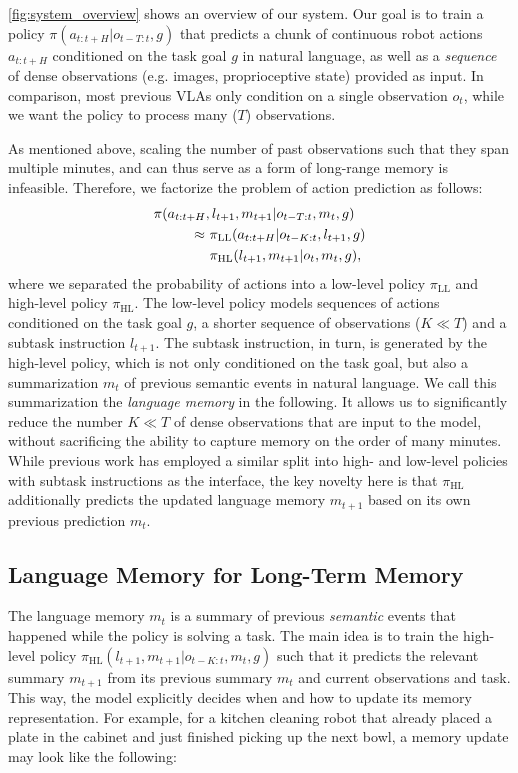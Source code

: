 \cref{fig:system_overview} shows an overview of our \Acronym{} system.
Our goal is to train a policy $\pi(a_{t:t+H} | o_{t-T:t}, g)$ that predicts a chunk of continuous robot actions $a_{t:t+H}$ conditioned on the task goal $g$ in natural language, as well as a \emph{sequence} of dense observations (e.g. images, proprioceptive state) provided as input.
In comparison, most previous VLAs only condition on a single observation $o_t$, while we want the policy to process many ($T$) observations.

As mentioned above, scaling the number of past observations such that they span multiple minutes, and can thus serve as a form of long-range memory is infeasible.
Therefore, we factorize the problem of action prediction as follows:
\begin{align*}
 	\pi(a_{t:t+H},&\,l_{t+1}, m_{t+1} | o_{t-T:t}, m_t, g) \notag \\
 	\approx~&\pi_\text{LL}(a_{t:t+H} | o_{t-K:t}, l_{t+1}, g) \\
    &\pi_\text{HL}(l_{t+1}, m_{t+1} | o_{t}, m_{t}, g),
\end{align*}
where we separated the probability of actions into a low-level policy $\pi_\text{LL}$ and high-level policy $\pi_\text{HL}$.
The low-level policy models sequences of actions conditioned on the task goal $g$, a shorter sequence of observations ($K \ll T$) and a subtask instruction $l_{t+1}$.
The subtask instruction, in turn, is generated by the high-level policy, which is not only conditioned on the task goal, but also a summarization $m_t$ of previous semantic events in natural language.
We call this summarization the \emph{language memory} in the following.
It allows us to significantly reduce the number $K\ll T$ of dense observations that are input to the model, without sacrificing the ability to capture memory on the order of many minutes.
While previous work has employed a similar split into high- and low-level policies with subtask instructions as the interface, the key novelty here is that $\pi_\text{HL}$ additionally predicts the updated language memory $m_{t+1}$ based on its own previous prediction $m_t$.







\subsection{Language Memory for Long-Term Memory}
\label{sec:language_memory}
The language memory $m_t$ is a summary of previous \emph{semantic} events that happened while the policy is solving a task.
The main idea is to train the high-level policy $\pi_\text{HL}(l_{t+1}, m_{t+1} | o_{t-K:t}, m_{t}, g)$ such that it predicts the relevant summary $m_{t+1}$ from its previous summary $m_t$ and current observations and task.
This way, the model explicitly decides when and how to update its memory representation. For example, for a kitchen cleaning robot that already placed a plate in the cabinet and just finished picking up the next bowl, a memory update may look like the following:

